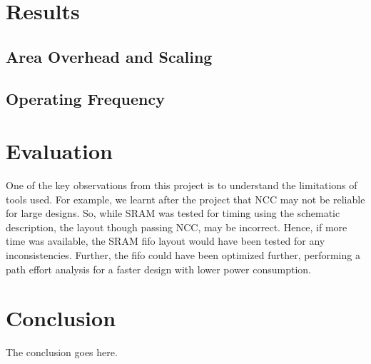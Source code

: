 \documentclass[12pt,journal,compsoc]{IEEEtran}
\begin{document}
\section{Results}
\subsection{Area Overhead and Scaling}
\subsection{Operating Frequency}
\section {Evaluation}
One of the key observations from this project is to understand the limitations of tools used. For example, we learnt after the project that NCC may not be reliable for large designs. So, while SRAM was tested for timing using the schematic description, the layout though passing NCC, may be incorrect. Hence, if more time was available, the SRAM fifo layout would have been tested for any inconsistencies. Further, the fifo could have been optimized further, performing a path effort analysis for a faster design with lower power consumption. 
\section{Conclusion}
The conclusion goes here.













\end{document}
